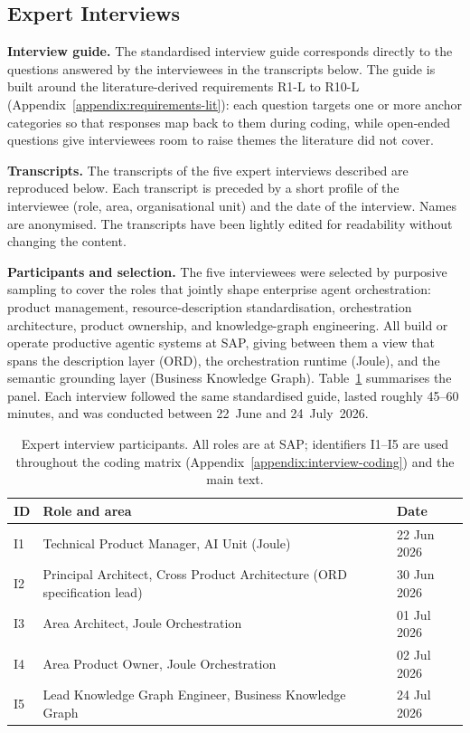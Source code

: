 \subsection{Expert Interviews}
\label{appendix:interviews}

\textbf{Interview guide.} The standardised interview guide corresponds directly to the questions answered by the interviewees in the transcripts below. The guide is built around the literature-derived requirements R1-L to R10-L (Appendix~\ref{appendix:requirements-lit}): each question targets one or more anchor categories so that responses map back to them during coding, while open-ended questions give interviewees room to raise themes the literature did not cover.

\textbf{Transcripts.} The transcripts of the five expert interviews described are reproduced below. Each transcript is preceded by a short profile of the interviewee (role, area, organisational unit) and the date of the interview. Names are anonymised. The transcripts have been lightly edited for readability without changing the content.

\textbf{Participants and selection.} The five interviewees were selected by purposive sampling to cover the roles that jointly shape enterprise agent orchestration: product management, resource-description standardisation, orchestration architecture, product ownership, and knowledge-graph engineering. All build or operate productive agentic systems at SAP, giving between them a view that spans the description layer (ORD), the orchestration runtime (Joule), and the semantic grounding layer (Business Knowledge Graph). Table~\ref{tab:interview-participants} summarises the panel. Each interview followed the same standardised guide, lasted roughly 45--60 minutes, and was conducted between 22~June and 24~July~2026.

\begin{table}[t]
  \renewcommand{\arraystretch}{1.2}
  \caption{Expert interview participants. All roles are at SAP; identifiers I1--I5 are used throughout the coding matrix (Appendix~\ref{appendix:interview-coding}) and the main text.}
  \label{tab:interview-participants}
  \centering\footnotesize
  \setlength{\tabcolsep}{4pt}
  \begin{tabularx}{\columnwidth}{@{} l X l @{}}
  \toprule
  \textbf{ID} & \textbf{Role and area} & \textbf{Date} \\
  \midrule
  I1 & Technical Product Manager, AI Unit (Joule) & 22 Jun 2026 \\
  I2 & Principal Architect, Cross Product Architecture (ORD specification lead) & 30 Jun 2026 \\
  I3 & Area Architect, Joule Orchestration & 01 Jul 2026 \\
  I4 & Area Product Owner, Joule Orchestration & 02 Jul 2026 \\
  I5 & Lead Knowledge Graph Engineer, Business Knowledge Graph & 24 Jul 2026 \\
  \bottomrule
  \end{tabularx}
\end{table}

